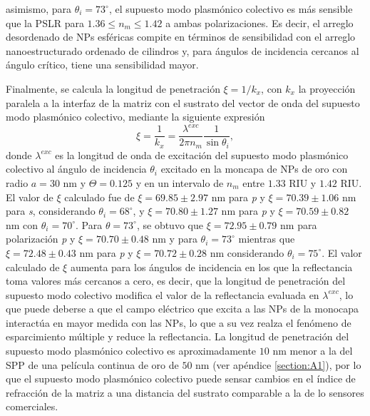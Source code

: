  asimismo, para $\theta_i=73^\circ$, el supuesto modo  plasmónico colectivo es más sensible que la PSLR para $1.36\leq n_m \leq 1.42$  a ambas polarizaciones. %
Es decir, el arreglo desordenado de NPs esféricas compite en términos de sensibilidad con el arreglo nanoestructurado ordenado de cilindros y, para ángulos de incidencia cercanos al ángulo crítico, tiene una sensibilidad mayor. 

Finalmente, se calcula la longitud de penetración $\xi=1/k_x$, con $k_x$ la proyección paralela a la interfaz de la matriz con el sustrato del vector de onda del supuesto modo plasmónico colectivo, mediante la siguiente expresión
%
\begin{equation}
\xi=\frac{1}{k_x}= \frac{\lambda^{exc}}{2\pi n_m}\frac{1}{\sin\theta_i},
\label{eq:penetracion}
\end{equation}
%
donde $\lambda^{exc}$ es la longitud de onda de excitación del supuesto modo plasmónico colectivo al ángulo de incidencia $\theta_i$ excitado en la moncapa de NPs de oro con radio $a=30$ nm y $\Theta=0.125$  y en un intervalo de $n_m$ entre $1.33$ RIU y $1.42$ RIU. El valor de $\xi$ calculado fue de $\xi= 69.85\pm 2.97$ nm para \emph{p} y $\xi=70.39\pm 1.06$ nm para \emph{s}, considerando $\theta_i=68^\circ$, y $\xi=70.80\pm 1.27$ nm para \emph{p} y $\xi=70.59\pm0.82$ nm con  $\theta_i=70^\circ$. Para $\theta=73^\circ$, se obtuvo que $\xi=72.95\pm 0.79$ nm para polarización \emph{p} y $\xi=70.70\pm 0.48$ nm y para $\theta_i=73^\circ$ mientras que $\xi=72.48\pm0.43$ nm para \emph{p} y $\xi=70.72\pm 0.28$ nm considerando $\theta_i=75^\circ$. El valor calculado de $\xi$ aumenta para los ángulos de incidencia en los que la reflectancia toma valores más cercanos a cero,  es decir, que la longitud de penetración del supuesto modo colectivo modifica el valor de la reflectancia evaluada en $\lambda^{exc}$, lo que puede deberse a que el campo eléctrico que excita a las NPs de la monocapa interactúa en mayor medida con las NPs, lo que a su vez realza el fenómeno de esparcimiento múltiple y reduce la reflectancia. La longitud de penetración del supuesto modo plasmónico colectivo es aproximadamente $10$ nm  menor a la del SPP de una película continua de oro de $50$ nm (ver apéndice \ref{section:A1}), por lo que el supuesto modo plasmónico colectivo puede sensar cambios en el índice de refracción de la matriz a una distancia del sustrato comparable a la de lo sensores comerciales.